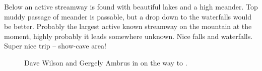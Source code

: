 Below  an active streamway is found with
beautiful lakes and a high meander. Top muddy passage of meander is
passable, but a drop down to the waterfalls would be better. Probably
the largest active known streamway on the mountain at the moment, highly
probably it leads somewhere unknown. Nice falls and waterfalls. Super nice trip -- show-cave area!

    
\begin{figure}
\checkoddpage \ifoddpage \forcerectofloat \else \forceversofloat \fi
{}
\caption{Dave Wilson and Gergely Ambrus in \protect{} on the way to \protect{}. }
\label{dave gergely friendship}
\end{figure}
